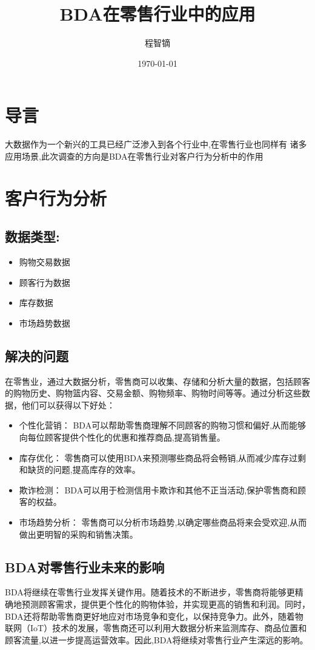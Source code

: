 \documentclass{article}
\title{BDA在零售行业中的应用}
\author{程智镝}
\date{\today}
\begin{document}
\maketitle

\section{导言}
大数据作为一个新兴的工具已经广泛渗入到各个行业中,在零售行业也同样有
诸多应用场景,此次调查的方向是BDA在零售行业对客户行为分析中的作用
\section{客户行为分析}
\subsection{数据类型:}
\begin{itemize}
\setlength{\itemindent}{2em} %
\item 购物交易数据
\item 顾客行为数据
\item 库存数据
\item 市场趋势数据
\end{itemize}

\subsection{解决的问题}
在零售业，通过大数据分析，零售商可以收集、存储和分析大量的数据，包括顾客的购物历史、购物篮内容、交易金额、购物频率、购物时间等等。通过分析这些数据，他们可以获得以下好处：
\begin{itemize}
    \setlength{\itemindent}{2em} %
    \item 个性化营销： BDA可以帮助零售商理解不同顾客的购物习惯和偏好,从而能够向每位顾客提供个性化的优惠和推荐商品,提高销售量。
    \item 库存优化： 零售商可以使用BDA来预测哪些商品将会畅销,从而减少库存过剩和缺货的问题,提高库存的效率。
    \item 欺诈检测： BDA可以用于检测信用卡欺诈和其他不正当活动,保护零售商和顾客的权益。
    \item 市场趋势分析： 零售商可以分析市场趋势,以确定哪些商品将来会受欢迎,从而做出更明智的采购和销售决策。
    \end{itemize}
\subsection{BDA对零售行业未来的影响}
BDA将继续在零售行业发挥关键作用。随着技术的不断进步，零售商将能够更精确地预测顾客需求，提供更个性化的购物体验，并实现更高的销售和利润。同时，BDA还将帮助零售商更好地应对市场竞争和变化，以保持竞争力。此外，随着物联网（IoT）技术的发展，零售商还可以利用大数据分析来监测库存、商品位置和顾客流量,以进一步提高运营效率。因此,BDA将继续对零售行业产生深远的影响。
\end{document}

